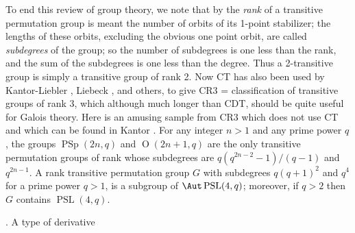 To end this review of group theory, we note that by
the {\it rank} of a transitive permutation group is meant 
the number of
orbits of its 1-point stabilizer; the lengths of these 
orbits, excluding
the obvious one point orbit, are called {\it subdegrees} 
of the group;
so the number of subdegrees is one less than the rank, and 
the sum of
the subdegrees is one less than the degree. Thus a 
2-transitive group is
simply a transitive group of rank 2. Now CT has also been 
used by
Kantor-Liebler \cite{KL}, Liebeck \cite{L}, and others, to 
give CR3
= classification of transitive groups of rank 3, which 
although much longer
than CDT, should be quite useful for Galois theory. Here 
is an amusing
sample from CR3 which does not use CT and which can be 
found in Kantor
\cite{K1}.
For any integer $n>1$ and any prime power $q$, the groups 
$\operatorname{PSp}(2n,q)$
and $\operatorname{O}(2n+1,q)$ are the only transitive 
permutation groups of
rank 
whose subdegrees are $q(q^{2n-2}-1)/(q-1)$ and $q^{2n-1}$.
A rank  transitive permutation group $G$ with 
subdegrees $q(q+1)^2$ and $q^4$
for a prime power $q>1$, is a subgroup of $\Aut 
\operatorname{PSL}(4,q)$\RM; moreover, if
$q>2$ then $G$ contains $\operatorname{PSL}(4,q)$.
\ethm

. A type of derivative\endheading

